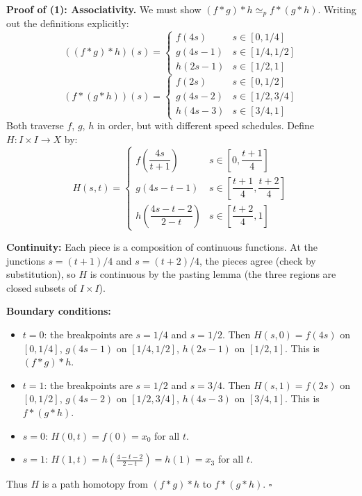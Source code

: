 \documentclass[11pt]{report}
\renewenvironment{proof}[1][Proof]{\noindent\textbf{#1.} }{\hfill$\square$\par\vspace{5pt}}
\begin{document}
\begin{proof}[Proof of (1): Associativity]
We must show $(f * g) * h \simeq_p f * (g * h)$. Writing out the definitions explicitly:
\[((f * g) * h)(s) = \begin{cases} f(4s) & s \in [0, 1/4] \\ g(4s - 1) & s \in [1/4, 1/2] \\ h(2s - 1) & s \in [1/2, 1] \end{cases}\]
\[(f * (g * h))(s) = \begin{cases} f(2s) & s \in [0, 1/2] \\ g(4s - 2) & s \in [1/2, 3/4] \\ h(4s - 3) & s \in [3/4, 1] \end{cases}\]
Both traverse $f$, $g$, $h$ in order, but with different speed schedules. Define $H: I \times I \to X$ by:
\[H(s, t) = \begin{cases} f\!\left(\dfrac{4s}{t + 1}\right) & s \in \left[0, \dfrac{t+1}{4}\right] \\[6pt] g(4s - t - 1) & s \in \left[\dfrac{t+1}{4}, \dfrac{t+2}{4}\right] \\[6pt] h\!\left(\dfrac{4s - t - 2}{2 - t}\right) & s \in \left[\dfrac{t+2}{4}, 1\right] \end{cases}\]

\textbf{Continuity:} Each piece is a composition of continuous functions. At the junctions $s = (t+1)/4$ and $s = (t+2)/4$, the pieces agree (check by substitution), so $H$ is continuous by the pasting lemma (the three regions are closed subsets of $I \times I$).

\textbf{Boundary conditions:}
\begin{itemize}[nosep]
    \item $t = 0$: the breakpoints are $s = 1/4$ and $s = 1/2$. Then $H(s, 0) = f(4s)$ on $[0, 1/4]$, $g(4s-1)$ on $[1/4, 1/2]$, $h(2s-1)$ on $[1/2, 1]$. This is $(f*g)*h$. \checkmark
    \item $t = 1$: the breakpoints are $s = 1/2$ and $s = 3/4$. Then $H(s, 1) = f(2s)$ on $[0, 1/2]$, $g(4s-2)$ on $[1/2, 3/4]$, $h(4s-3)$ on $[3/4, 1]$. This is $f*(g*h)$. \checkmark
    \item $s = 0$: $H(0, t) = f(0) = x_0$ for all $t$. \checkmark
    \item $s = 1$: $H(1, t) = h\!\left(\frac{4 - t - 2}{2 - t}\right) = h(1) = x_3$ for all $t$. \checkmark
\end{itemize}
Thus $H$ is a path homotopy from $(f * g) * h$ to $f * (g * h)$.
\end{proof}
\end{document}
